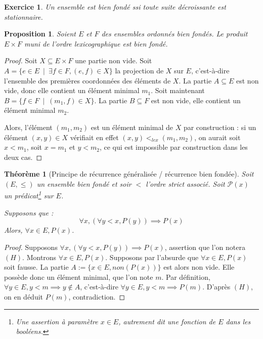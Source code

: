 \documentclass[12pt]{article}
\newtheorem{theoreme}[thm]{Théorème}
\newtheorem*{exo}{Exercice}
\newtheorem{proposition}[thm]{Proposition}
\begin{document}
\begin{exo}
Un ensemble est bien fondé ssi toute suite décroissante est stationnaire.
\end{exo}



\begin{proposition} Soient $E$ et $F$ des ensembles ordonnés bien fondés.
Le produit $E\times F$ muni de l'ordre lexicographique est bien fondé.
\end{proposition}
\begin{proof}
Soit $X \subseteq E\times F$ une partie non vide.
Soit $A = \{e \in E\:\mid\: \exists f\in F, (e,f)\in X\}$ la projection de $X$ sur $E$, c'est-à-dire l'ensemble des premières coordonnées des éléments de $X$.
La partie $A\subseteq E$ est non vide, donc elle contient un élément minimal $m_1$.
Soit maintenant $B = \{f\in F\:\mid\: (m_1,f) \in X\}$.
La partie $B \subseteq F$ est non vide, elle contient un élément minimal $m_2$.

Alors, l'élément $(m_1,m_2)$ est un élément minimal de $X$ par construction : si un élément $(x,y) \in X$ vérifiait en effet $(x,y) <_{lex} (m_1,m_2)$, on aurait soit $x < m_1$, soit $x=m_1$ et $y<m_2$, ce qui est impossible par construction dans les deux cas.
\end{proof}



\begin{theoreme}[Principe de récurrence généralisée / récurrence bien fondée]
Soit $(E,\leq)$ un ensemble bien fondé et soir $<$ l'ordre strict associé.
Soit $\mathcal P(x)$ un prédicat\footnote{Une assertion à paramètre $x\in E$, autrement dit une fonction de $E$ dans les booléens.} sur $E$. 

Supposons que : 
\[ \forall x, (\forall y< x, P(y)) \implies P(x)\]
Alors, $\forall x\in E, P(x)$.
\end{theoreme}



\begin{proof}
Supposons $\forall x, (\forall y< x, P(y)) \implies P(x)$, assertion que l'on notera $(H)$.
Montrons $\forall x\in E, P(x)$.
Supposons par l'absurde que  $\forall x\in E, P(x)$ soit fausse.
La partie $A := \{x\in E, non(P(x))\}$ est alors non vide.
Elle possède donc un élément minimal, que l'on note $m$.
Par définition, $\forall y\in E, y< m \implies y\not\in A$, c'est-à-dire $\forall y\in E, y< m \implies P(m)$.
D'après $(H)$, on en déduit $P(m)$, contradiction.
\end{proof}
\end{document}
